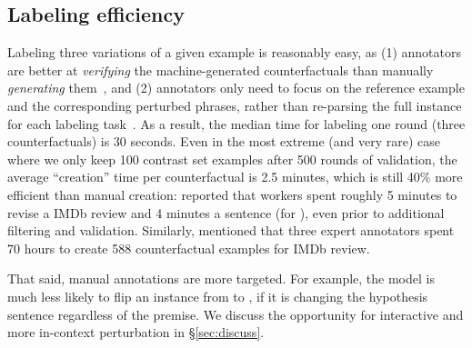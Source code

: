 \subsection{Labeling efficiency}
\label{subsec:label_procedure}




Labeling three variations of a given example is reasonably easy, as (1) annotators are better at \emph{verifying} the machine-generated counterfactuals than manually \emph{generating} them~\cite{ribeiro2018sear}, and (2) annotators only need to focus on the reference example and the corresponding perturbed phrases, rather than re-parsing the full instance for each labeling task~\cite{Khashabi2020MoreBF}.
As a result, the median time for labeling one round (three counterfactuals) is 30 seconds.
Even in the most extreme (and very rare) case where we only keep 100 contrast set examples after 500 rounds of validation, the average ``creation'' time per counterfactual is 2.5 minutes, which is still 40\% more efficient than manual creation:
\citet{kaushik2019learning} reported that workers spent roughly 5 minutes to revise a IMDb review and 4 minutes a sentence (for \nli), even prior to additional filtering and validation.
Similarly, \citet{gardner2020contrast} mentioned that three expert annotators spent 70 hours to create 588 counterfactual examples for IMDb review.



That said, manual annotations are more targeted. 
For example, the model is much less likely to flip an \nli instance from  to , if it is changing the hypothesis sentence regardless of the premise.
We discuss the opportunity for interactive and more in-context perturbation in \S\ref{sec:discuss}.



